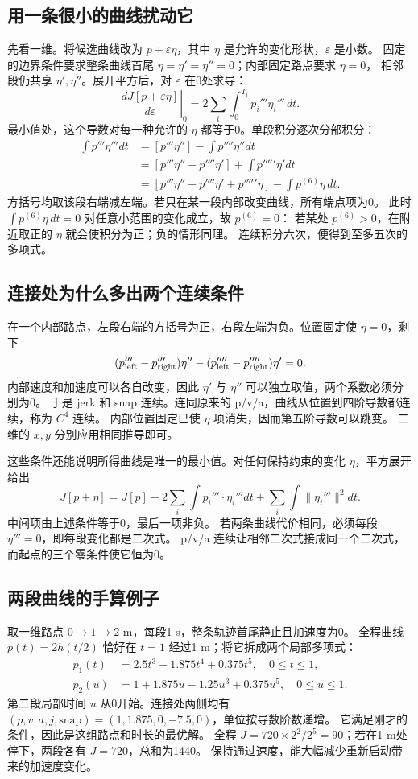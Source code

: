 \subsection{用一条很小的曲线扰动它}
先看一维。将候选曲线改为 $p+\varepsilon\eta$，其中 $\eta$ 是允许的变化形状，$\varepsilon$ 是小数。
固定的边界条件要求整条曲线首尾 $\eta=\eta'=\eta''=0$；内部固定路点要求 $\eta=0$，
相邻段仍共享 $\eta',\eta''$。展开平方后，对 $\varepsilon$ 在0处求导：
\[
 \left.\frac{dJ[p+\varepsilon\eta]}{d\varepsilon}\right|_0
 =2\sum_i\int_0^{T_i}p_i'''\eta_i'''\,dt.
\]
最小值处，这个导数对每一种允许的 $\eta$ 都等于0。单段积分逐次分部积分：
\begin{align}
 \int p'''\eta'''dt
 &= [p'''\eta'']-\int p''''\eta''dt\\
 &= [p'''\eta''-p''''\eta']+\int p'''''\eta'dt\\
 &= [p'''\eta''-p''''\eta'+p'''''\eta]-\int p^{(6)}\eta\,dt.
 \label{eq:minco-parts}
\end{align}
方括号均取该段右端减左端。若只在某一段内部改变曲线，所有端点项为0。
此时 $\int p^{(6)}\eta\,dt=0$ 对任意小范围的变化成立，故 $p^{(6)}=0$：
若某处 $p^{(6)}>0$，在附近取正的 $\eta$ 就会使积分为正；负的情形同理。
连续积分六次，便得到至多五次的多项式。

\subsection{连接处为什么多出两个连续条件}
在一个内部路点，左段右端的方括号为正，右段左端为负。位置固定使 $\eta=0$，剩下
\[
 (p'''_{\rm left}-p'''_{\rm right})\eta''
 -(p''''_{\rm left}-p''''_{\rm right})\eta'=0.
\]
内部速度和加速度可以各自改变，因此 $\eta'$ 与 $\eta''$ 可以独立取值，两个系数必须分别为0。
于是 jerk 和 snap 连续。连同原来的 p/v/a，曲线从位置到四阶导数都连续，称为 $C^4$ 连续。
内部位置固定已使 $\eta$ 项消失，因而第五阶导数可以跳变。
二维的 $x,y$ 分别应用相同推导即可。

这些条件还能说明所得曲线是唯一的最小值。对任何保持约束的变化 $\eta$，平方展开给出
\[
 J[p+\eta]=J[p]+2\sum_i\int p_i'''\cdot\eta_i'''dt
                   +\sum_i\int\|\eta_i'''\|^2dt.
\]
中间项由上述条件等于0，最后一项非负。
若两条曲线代价相同，必须每段 $\eta'''=0$，即每段变化都是二次式。
p/v/a 连续让相邻二次式接成同一个二次式，而起点的三个零条件使它恒为0。

\subsection{两段曲线的手算例子}
取一维路点 $0\to1\to2$ m，每段1 s，整条轨迹首尾静止且加速度为0。
全程曲线 $p(t)=2h(t/2)$ 恰好在 $t=1$ 经过1 m；将它拆成两个局部多项式：
\begin{align*}
 p_1(t)&=2.5t^3-1.875t^4+0.375t^5,\quad 0\le t\le1,\\
 p_2(u)&=1+1.875u-1.25u^3+0.375u^5,\quad 0\le u\le1.
\end{align*}
第二段局部时间 $u$ 从0开始。连接处两侧均有
$(p,v,a,j,\mathrm{snap})=(1,1.875,0,-7.5,0)$，单位按导数阶数递增。
它满足刚才的条件，因此是这组路点和时长的最优解。
全程 $J=720\times2^2/2^5=90$；若在1 m处停下，两段各有 $J=720$，总和为1440。
保持通过速度，能大幅减少重新启动带来的加速度变化。

